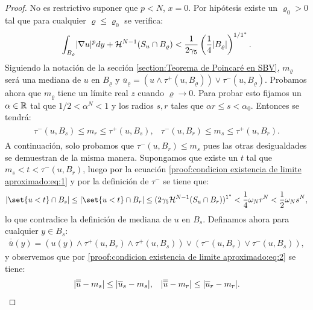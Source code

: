 \documentclass[a4paper,11pt,spanish, twoside, leqno]{tfm-uam}
\begin{document}
\begin{proof}
No es restrictivo suponer que $p<N$, $x=0$. Por hipótesis existe un $\varrho_{0}>0$ tal que para cualquier $\varrho\leq \varrho_{0}$ se verifica:
\begin{align}\label{proof:condicion existencia de limite aproximado:eq:1}
\int_{B_{\varrho}}\lvert\nabla{u}\rvert^{p}dy+\mathcal{H}^{N-1}(S_{u}\cap B_{\varrho})<\dfrac{1}{2\gamma_{5}}\left ( \dfrac{1}{4}\lvert B_{\varrho}\rvert\right )^{1/1^{*}}.
\end{align}
Siguiendo la notación de la sección \ref{section:Teorema de Poincaré en SBV}, $m_{\varrho}$ será una mediana de $u$ en $B_{\varrho}$ y $\overline{u}_{\varrho}=(u\wedge \tau^{+}(u, B_{\varrho}))\vee \tau^{-}(u,B_{\varrho})$. Probamos ahora que $m_{\varrho}$ tiene un límite real $z$ cuando $\varrho\to 0$. Para probar esto fijamos un $\alpha\in \mathbb{R}$ tal que $1/2<\alpha^{N}<1$ y los radios $s,r$ tales que $\alpha r\leq s<\alpha_{0}$. Entonces se tendrá:
\begin{align}\label{proof:condicion existencia de limite aproximado:eq:2}
\begin{array}{ll}
\tau^{-}(u,B_{s})\leq m_{r}\leq \tau^{+}(u, B_{s}),&\tau^{-}(u,B_{r})\leq m_{s}\leq \tau^{+}(u, B_{r}).
\end{array}
\end{align}
A continuación, solo probamos que  $\tau^{-}(u,B_{r})\leq m_{s}$ pues las otras desigualdades se demuestran de la misma manera. Supongamos que existe un $t$ tal que $m_{s}<t<\tau^{-}(u,B_{r})$, luego por la ecuación \ref{proof:condicion existencia de limite aproximado:eq:1} y por la definición de $\tau^{-}$ se tiene que:
\begin{align*}
\abs{\set{u<t}\cap B_{s}}\leq \abs{\set{u<t}\cap B_{r}}\leq (2\gamma_{5}\Hm{N-1}(S_{u}\cap B_{r}))^{1^{*}}<\frac{1}{4}\omega_{N}r^{N}<\frac{1}{2}\omega_{N}s^{N},
\end{align*}
lo que contradice la definición de mediana de $u$ en $B_{s}$. Definamos ahora para cualquier $y\in B_{s}$:
\begin{align*}
\overline{\overline{u}}(y)=(u(y)\wedge \tau^{+}(u,B_{r})\wedge\tau^{+}(u,B_{s}))\vee (\tau^{-}(u,B_{r})\vee \tau^{-}(u,B_{s})),
\end{align*}
y observemos que por \ref{proof:condicion existencia de limite aproximado:eq:2} se tiene:
\begin{align*}
\begin{array}{ll}
\lvert\overline{\overline{u}}-m_{s}\rvert\leq \lvert\overline{u}_{s}-m_{s}\rvert,& \lvert\overline{\overline{u}}-m_{r}\rvert\leq \lvert\overline{u}_{r}-m_{r}\rvert.

\end{array}
\end{align*}
\end{proof}
\end{document}
